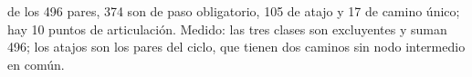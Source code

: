 {de los 496 pares, 374 son de paso obligatorio, 105 de atajo y 17 de camino único; hay 10 puntos de articulación.}
{Medido: las tres clases son excluyentes y suman 496; los atajos son los pares del ciclo, que tienen dos caminos sin nodo intermedio en común.}
